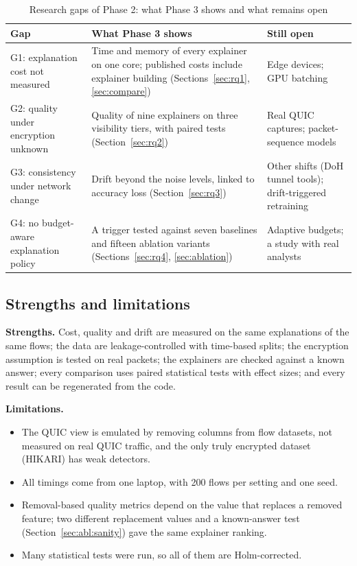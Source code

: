 \begin{table}[!htbp]
\centering
\caption{Research gaps of Phase 2: what Phase 3 shows and what remains open}
\label{tab:gapmap}
\scriptsize
\setlength{\tabcolsep}{3.5pt}
\begin{tabularx}{\textwidth}{>{\raggedright\arraybackslash}p{3.2cm} Y >{\raggedright\arraybackslash}p{3.8cm}}
\toprule
\textbf{Gap} & \textbf{What Phase 3 shows} & \textbf{Still open} \\
\midrule
G1: explanation cost not measured & Time and memory of every explainer on one core; published costs include explainer building (Sections~\ref{sec:rq1}, \ref{sec:compare}) & Edge devices; GPU batching \\
G2: quality under encryption unknown & Quality of nine explainers on three visibility tiers, with paired tests (Section~\ref{sec:rq2}) & Real QUIC captures; packet-sequence models \\
G3: consistency under network change & Drift beyond the noise levels, linked to accuracy loss (Section~\ref{sec:rq3}) & Other shifts (DoH tunnel tools); drift-triggered retraining \\
G4: no budget-aware explanation policy & A trigger tested against seven baselines and fifteen ablation variants (Sections~\ref{sec:rq4}, \ref{sec:ablation}) & Adaptive budgets; a study with real analysts \\
\bottomrule
\end{tabularx}
\end{table}

\subsection{Strengths and limitations}
\textbf{Strengths.} Cost, quality and drift are measured on the same explanations of the same flows; the data are leakage-controlled with time-based splits; the encryption assumption is tested on real packets; the explainers are checked against a known answer; every comparison uses paired statistical tests with effect sizes; and every result can be regenerated from the code.

\textbf{Limitations.}
\begin{itemize}[leftmargin=*, itemsep=0pt]
  \item The QUIC view is emulated by removing columns from flow datasets, not measured on real QUIC traffic, and the only truly encrypted dataset (HIKARI) has weak detectors.
  \item All timings come from one laptop, with 200 flows per setting and one seed.
  \item Removal-based quality metrics depend on the value that replaces a removed feature; two different replacement values and a known-answer test (Section~\ref{sec:abl:sanity}) gave the same explainer ranking.
  \item Many statistical tests were run, so all of them are Holm-corrected.
\end{itemize}

